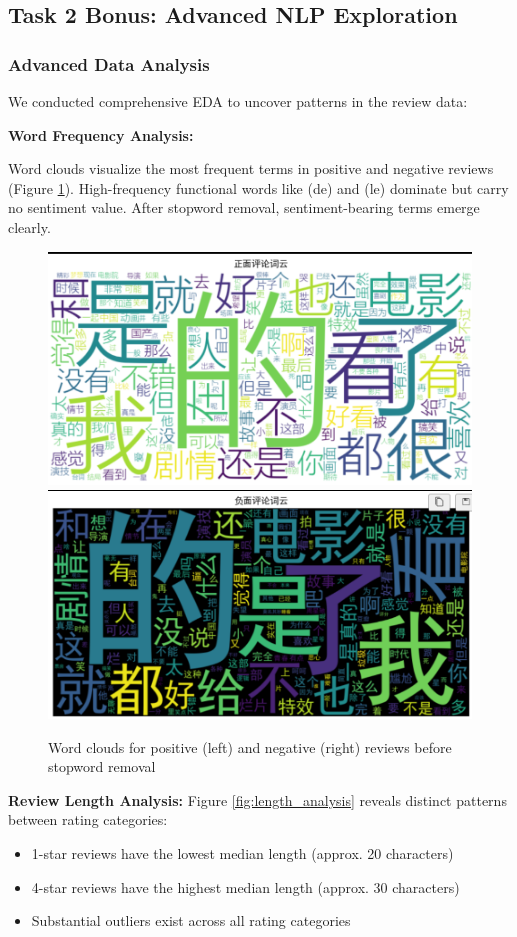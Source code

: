 \documentclass{article}
\begin{document}
\subsection{Task 2 Bonus: Advanced NLP Exploration}

\subsubsection{Advanced Data Analysis}
\label{sssec:advanced_analysis}

We conducted comprehensive EDA to uncover patterns in the review data:

\textbf{Word Frequency Analysis:} 

Word clouds visualize the most frequent terms in positive and negative reviews 
(Figure \ref{fig:wordclouds}). High-frequency functional words like (de) and (le) dominate 
but carry no sentiment value. After stopword removal, sentiment-bearing terms emerge clearly.

\begin{figure}[h]
    \centering
    \includegraphics[width=0.45\columnwidth]{pic/T2P2B1.1.png}
    \includegraphics[width=0.45\columnwidth]{pic/T2P2B1.2.png}
    \caption{Word clouds for positive (left) and negative (right) reviews before stopword removal}
    \label{fig:wordclouds}
\end{figure}

\textbf{Review Length Analysis:} 
Figure \ref{fig:length_analysis} reveals distinct patterns between rating categories:
\begin{itemize}
    \item 1-star reviews have the lowest median length (approx. 20 characters)
    \item 4-star reviews have the highest median length (approx. 30 characters)
    \item Substantial outliers exist across all rating categories
\end{itemize}
\end{document}
